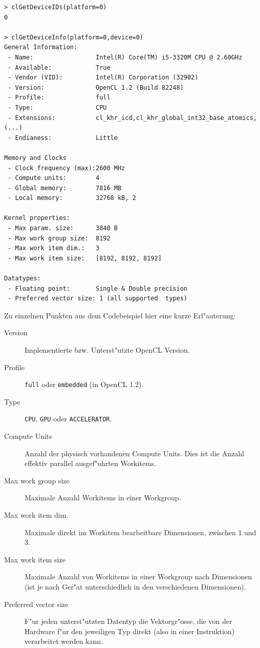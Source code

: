 \begin{refsection}
\begin{small}
\begin{verbatim}
> clGetDeviceIDs(platform=0)
0

> clGetDeviceInfo(platform=0,device=0)
General Information:
 - Name:                 Intel(R) Core(TM) i5-3320M CPU @ 2.60GHz
 - Available:            True
 - Vendor (VID):         Intel(R) Corporation (32902)
 - Version:              OpenCL 1.2 (Build 82248)
 - Profile:              full
 - Type:                 CPU 
 - Extensions:           cl_khr_icd,cl_khr_global_int32_base_atomics,(...)
 - Endianess:            Little

Memory and Clocks
 - Clock frequency (max):2600 MHz
 - Compute units:        4
 - Global memory:        7816 MB
 - Local memory:         32768 kB, 2

Kernel properties:
 - Max param. size:      3840 B
 - Max work group size:  8192
 - Max work item dim.:   3
 - Max work item size:   [8192, 8192, 8192]

Datatypes:
 - Floating point:       Single & Double precision
 - Preferred vector size: 1 (all supported  types)
\end{verbatim}
\end{small}

\vspace{1em}

\noindent Zu einzelnen Punkten aus dem Codebeispiel hier eine kurze Erl"auterung:


\begin{description}
 \item [Version] Implementierte bzw. Unterst"utzte OpenCL Version.
 \item [Profile] \texttt{full} oder \texttt{embedded} (in OpenCL 1.2).
 \item [Type]    \texttt{CPU}, \texttt{GPU} oder \texttt{ACCELERATOR}.
 \item [Compute Units] Anzahl der physisch vorhandenen Compute Units. Dies ist
                 die Anzahl effektiv pa\-ral\-lel ausgef"uhrten Workitems.
 \item [Max work group size] Maximale Anzahl Workitems in einer Workgroup.
 \item [Max work item dim.] Maximale direkt im Workitem bearbeitbare
	 Dimensionen, zwischen 1 und 3.
 \item [Max work item size] Maximale Anzahl von Workitems in einer Workgroup nach
                 Dimensionen (ist je nach Ger"at unterschiedlich in den verschiedenen
                 Dimensionen).
 \item [Preferred vector size] F"ur jeden unterst"utzten Datentyp die Vektorgr"osse, 
                 die von der Hardware f"ur den jeweiligen Typ direkt (also in einer 
                 Instruktion) verarbeitet werden kann.
 

\end{description}
\end{refsection}
